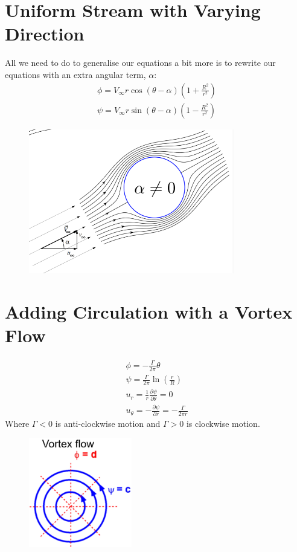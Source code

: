 \documentclass[class=report, crop=false, 12pt,a4paper]{standalone}
\begin{document}
\section{Uniform Stream with Varying Direction}
All we need to do to generalise our equations a bit more is to rewrite our equations with an extra angular term, $\alpha$:
\begin{gather}
  \phi = V_{\infty}r\cos(\theta-\alpha)\left(1+\frac{R^2}{r^2}\right)\\
  \psi = V_{\infty}r\sin(\theta-\alpha)\left(1-\frac{R^2}{r^2}\right)
\end{gather}
\begin{figure}[H]
  \centering
  \includegraphics[width = 0.8\textwidth]{../img/diagram23.png}
\end{figure}
\section{Adding Circulation with a Vortex Flow}
\begin{gather}
  \phi = -\frac{\Gamma}{2\pi}\theta\\
  \psi = \frac{\Gamma}{2\pi}\ln\left(\frac{r}{R}\right)\\
  u_r = \frac{1}{r}\frac{\partial \psi}{\partial \theta} = 0\\
  u_{\theta} = -\frac{\partial \psi}{\partial r} = -\frac{\Gamma}{2\pi r}
\end{gather}
Where $\Gamma < 0$ is anti-clockwise motion and $\Gamma > 0$ is clockwise motion.
\begin{figure}[H]
  \centering
  \includegraphics[width = 0.4\textwidth]{../img/diagram24.png}
\end{figure}
\end{document}
